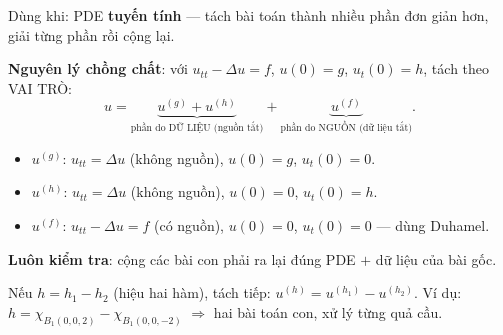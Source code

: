 \begin{dieukienbox}
Dùng khi: PDE \textbf{tuyến tính} --- tách bài toán thành nhiều phần đơn giản hơn,
giải từng phần rồi cộng lại.
\end{dieukienbox}

\begin{nhobox}
\textbf{Nguyên lý chồng chất}: với $u_{tt}-\Delta u = f$, $u(0)=g$, $u_t(0)=h$, tách theo VAI TRÒ:
\[
  u = \underbrace{u^{(g)} + u^{(h)}}_{\text{phần do DỮ LIỆU (nguồn tắt)}} + \underbrace{u^{(f)}}_{\text{phần do NGUỒN (dữ liệu tắt)}}.
\]
\begin{itemize}
  \item $u^{(g)}$: $u_{tt}=\Delta u$ (không nguồn), $u(0)=g$, $u_t(0)=0$.
  \item $u^{(h)}$: $u_{tt}=\Delta u$ (không nguồn), $u(0)=0$, $u_t(0)=h$.
  \item $u^{(f)}$: $u_{tt}-\Delta u=f$ (có nguồn), $u(0)=0$, $u_t(0)=0$ --- dùng Duhamel.
\end{itemize}
\textbf{Luôn kiểm tra}: cộng các bài con phải ra lại đúng PDE $+$ dữ liệu của bài gốc.
\end{nhobox}

\begin{meobox}
Nếu $h = h_1 - h_2$ (hiệu hai hàm), tách tiếp: $u^{(h)} = u^{(h_1)} - u^{(h_2)}$.
Ví dụ: $h = \chi_{B_1(0,0,2)} - \chi_{B_1(0,0,-2)}$ $\Rightarrow$ hai bài toán con, xử lý từng quả cầu.
\end{meobox}
